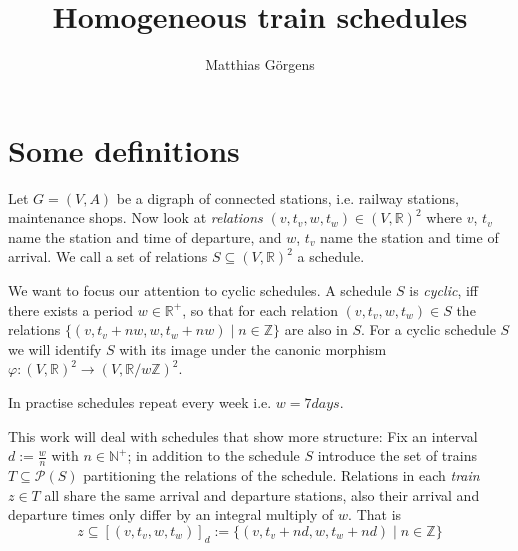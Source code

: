 \documentclass{article} %
\begin{document}
\author{Matthias Görgens}
\title{Homogeneous train schedules}
\maketitle
{}


\section{Some definitions}

Let \(G=(V,A)\) be a digraph of connected stations, i.e. railway
stations, maintenance shops.  Now look at \label{relation}
\textit{relations} \((v, t_v, w, t_w) \in \left(V,\mathbb{R}\right)^2
\) where \(v\), \(t_v\) name the station and time of departure, and
\(w\), \(t_v\) name the station and time of arrival.  We call a set of
relations \(S \subseteq \left(V,\mathbb{R}\right)^2\) a schedule.

We want to focus our attention to cyclic schedules.  A schedule \(S\)
is \label{cyclic} \textit{cyclic}, iff there exists a period \(w \in
\mathbb{R}^+\), so that for each relation \((v, t_v, w, t_w) \in S\)
the relations \(\{(v, t_v+n w, w, t_w +n w) \mid n \in \mathbb{Z}\}\)
are also in \(S\).  For a cyclic schedule \(S\) we will identify \(S\)
with its image under the canonic morphism \(\varphi \colon
\left(V,\mathbb{R}\right)^2 \to \left(V,\mathbb{R}/{w
    \mathbb{Z}}\right)^2\).

In practise schedules repeat every week i.e. \(w = 7 \unit{days}\).

This work will deal with schedules that show more structure: Fix an
interval \(d := \frac{w}{n}\) with \(n \in \mathbb{N}^+\); in addition
to the schedule \(S\) introduce the set of trains \(T \subseteq
\mathcal{P}(S)\) partitioning the relations of the schedule.
Relations in each \textit{train} \(z \in T\) all share the same arrival
and departure stations, also their arrival and departure times only
differ by an integral multiply of \(w\).  That is
\begin{equation}
  z \subseteq [(v, t_v, w, t_w )]_d := \{(v, t_v+n d, w, t_w +n d) \mid n \in \mathbb{Z}\}
\end{equation}
\end{document}
